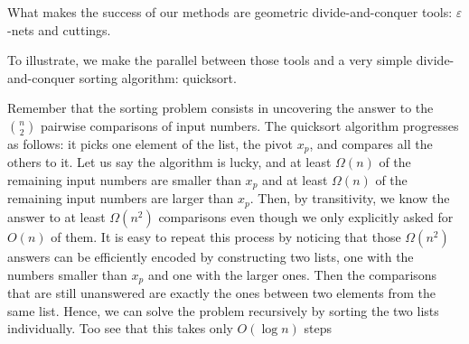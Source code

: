 
What makes the success of our methods are geometric divide-and-conquer
tools: \(\varepsilon\)-nets and cuttings.

To illustrate, we make the parallel between those tools and
a very simple divide-and-conquer sorting algorithm: quicksort.

Remember that the sorting problem consists in uncovering the answer to the
\(n \choose 2\) pairwise comparisons of input numbers.
The quicksort algorithm progresses as follows: it picks one element of the
list, the pivot \(x_p\), and compares all the others to it. Let us say the algorithm is
lucky, and at least \(\Omega(n)\) of the remaining input numbers are
smaller than
\(x_p\)
and at least \(\Omega(n)\) of the remaining input numbers are larger than
\(x_p\). Then, by transitivity, we know the answer to at least
\(\Omega(n^2)\) comparisons
even though we only explicitly asked for \(O(n)\) of them. It is easy to repeat
this process by noticing that those \(\Omega(n^2)\) answers can be efficiently encoded by
constructing two lists, one with the numbers smaller than \(x_p\) and one with
the larger ones. Then the comparisons that are still unanswered are exactly the
ones between two elements from the same list. Hence, we can solve the problem
recursively by sorting the two lists individually.
Too see that this takes only \(O(\log n)\) steps


